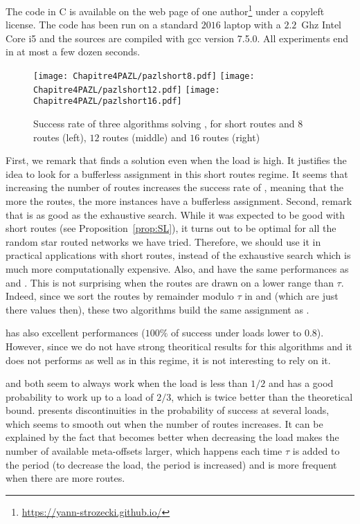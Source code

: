      The code in C is available on the web page of one author\footnote{\url{https://yann-strozecki.github.io/}} under a copyleft license. The code has been run on a standard $2016$ laptop with a $2.2$~Ghz Intel Core i5 and the sources are compiled with gcc version 7.5.0. All experiments end in at most a few dozen seconds.



      \begin{figure}[h]
      \begin{center}
   \texttt{[image: Chapitre4PAZL/pazlshort8.pdf]}
   \texttt{[image: Chapitre4PAZL/pazlshort12.pdf]}
   \texttt{[image: Chapitre4PAZL/pazlshort16.pdf]}
      \end{center}
      \caption{Success rate of three algorithms solving \pma, for short routes and $8$ routes (left), $12$ routes (middle) and $16$ routes (right)}\label{fig:short}
      \end{figure}

      First, we remark that \ESCA finds a solution even when the load is high. It justifies the idea to look for a bufferless assignment in this short routes regime. It seems that increasing the number of routes increases the success rate of \ESCA, meaning that the more the routes, the more instances have a bufferless assignment. 
      Second, remark that \shortestlongest is as good as the exhaustive search. While it was expected to be good with short routes (see Proposition~\ref{prop:SL}), it turns out to be optimal for all the random star routed networks we have tried. Therefore, we should use it in practical applications with short routes, instead of the exhaustive search which is much more computationally expensive. 
      Also, \compactpair and \compactfit have the same performances as \ESCA and \shortestlongest. This is not surprising when the routes are drawn on a lower range than $\tau$. Indeed, since we sort the routes by remainder modulo $\tau$  in \compactpair and \compactfit (which are just there values then), these two algorithms build the same assignment as \shortestlongest.

       \firstfit has also excellent performances ($100\%$ of success under loads lower to $0.8$). However, since we do not have strong theoritical results for this algorithms and it does not performs as well as \shortestlongest in this regime, it is not interesting to rely on it.

      \metaoffset and \greedyuniform both seem to always work when the load is less than $1/2$ and has a good probability to work up to a load of $2/3$, which is twice better than the theoretical bound. \metaoffset presents discontinuities in the probability of success at several loads, which seems to smooth out when the number of routes increases. It can be explained by the fact that \metaoffset becomes better when decreasing the load makes the number of available meta-offsets larger, which happens each time $\tau$ is added to the period (to decrease the load, the period is increased) and is more frequent when there are more routes.
      
